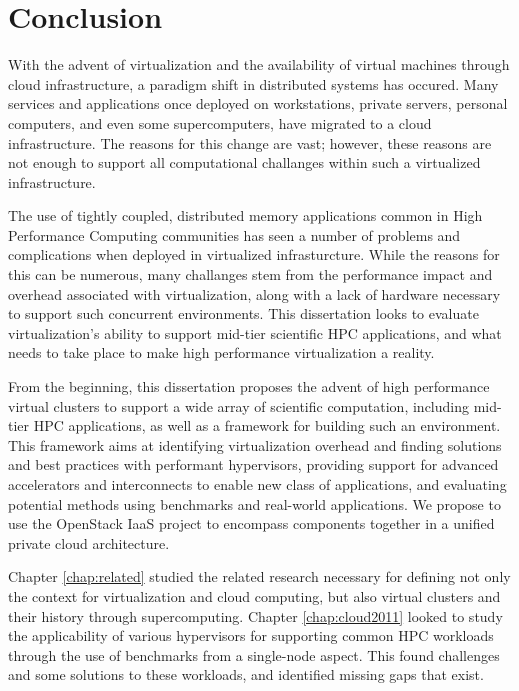 
\chapter{Conclusion}
\label{chap:conc}

With the advent of virtualization and the availability of virtual machines through cloud infrastructure, a paradigm shift in distributed systems has occured. Many services and applications once deployed on workstations, private servers, personal computers, and even some supercomputers, have migrated to a cloud infrastructure. The reasons for this change are vast; however, these reasons are not enough to support all computational challanges within such a virtualized infrastructure.

The use of tightly coupled, distributed memory applications common in High Performance Computing communities has seen a number of problems and complications when deployed in virtualized infrasturcture.  While the reasons for this can be numerous, many challanges  stem from the performance impact and overhead associated with virtualization, along with a lack of hardware necessary to support such concurrent environments. This dissertation looks to evaluate virtualization's ability to support mid-tier scientific HPC applications, and what needs to take place to make high performance virtualization a reality.

From the beginning, this dissertation proposes the advent of high performance virtual clusters to support a wide array of scientific computation, including mid-tier HPC applications, as well as a framework for building such an environment. This framework aims at identifying virtualization overhead and finding solutions and best practices with performant hypervisors, providing support for advanced accelerators and interconnects to enable new class of applications, and evaluating potential methods using benchmarks and real-world applications.  We propose to use the OpenStack IaaS project to encompass components together in a unified private cloud architecture.  


Chapter \ref{chap:related} studied the related research necessary for defining not only the context for virtualization and cloud computing, but also virtual clusters and their history through supercomputing.  Chapter \ref{chap:cloud2011} looked to study the applicability of various hypervisors for supporting common HPC workloads through the use of benchmarks from a single-node aspect.  This found challenges and some solutions to these workloads, and identified missing gaps that exist. 

